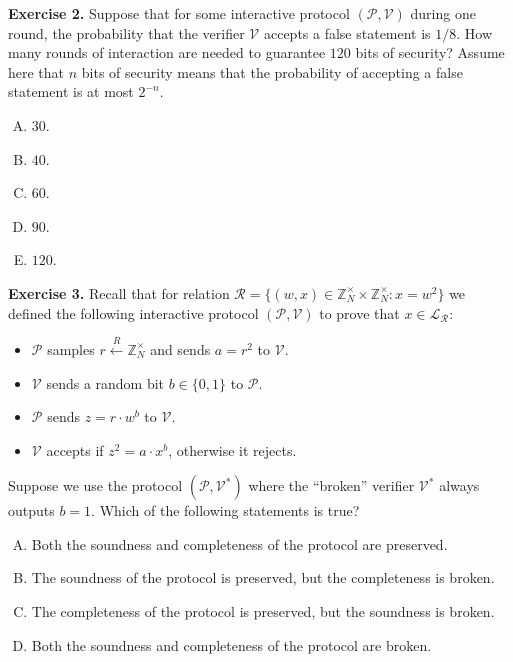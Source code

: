 \documentclass[../lecture-notes.tex]{subfiles}
\begin{document}
\textbf{Exercise 2.} Suppose that for some interactive protocol $(\mathcal{P}, \mathcal{V})$ during one round, the probability that the verifier $\mathcal{V}$ accepts a false statement is $1/8$. How many rounds of interaction are needed to guarantee $120$ bits of security? Assume here that $n$ bits of security means that the probability of accepting a false statement is at most $2^{-n}$.
\begin{enumerate}[(A)]
    \item $30$.
    \item $40$.
    \item $60$.
    \item $90$.
    \item $120$.
\end{enumerate}

\textbf{Exercise 3.} Recall that for relation $\mathcal{R} = \{(w,x) \in \mathbb{Z}_N^{\times} \times \mathbb{Z}_N^{\times}: x = w^2\}$ we defined the following interactive protocol $(\mathcal{P}, \mathcal{V})$ to prove that $x \in \mathcal{L}_{\mathcal{R}}$:
\begin{itemize}
    \item $\mathcal{P}$ samples $r \xleftarrow{R} \mathbb{Z}_N^{\times}$ and sends $a = r^2$ to $\mathcal{V}$.
    \item $\mathcal{V}$ sends a random bit $b \in \{0,1\}$ to $\mathcal{P}$.
    \item $\mathcal{P}$ sends $z = r \cdot w^b$ to $\mathcal{V}$.
    \item $\mathcal{V}$ accepts if $z^2 = a \cdot x^b$, otherwise it rejects.
\end{itemize}

Suppose we use the protocol $(\mathcal{P}, \mathcal{V}^*)$ where the ``broken'' verifier $\mathcal{V}^*$ always outputs $b=1$. Which of the following statements is true?
\begin{enumerate}[(A)]
    \item Both the soundness and completeness of the protocol are preserved.
    \item The soundness of the protocol is preserved, but the completeness is broken.
    \item The completeness of the protocol is preserved, but the soundness is broken.
    \item Both the soundness and completeness of the protocol are broken.
\end{enumerate}
\end{document}
